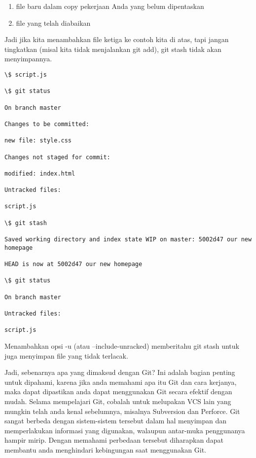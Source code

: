 \begin{enumerate}
\item file baru dalam copy pekerjaan Anda yang belum dipentaskan
\item file yang telah diabaikan
\setcounter{numberedCntB}{\theenumi}
\end{enumerate}
Jadi jika kita menambahkan file ketiga ke contoh kita di atas, tapi 
jangan tingkatkan (misal kita tidak menjalankan git add), git stash 
tidak akan menyimpannya.\vspace{12pt} 

\begin{verbatim}
\$ script.js

\$ git status

On branch master

Changes to be committed:

new file: style.css

Changes not staged for commit:

modified: index.html

Untracked files:

script.js

\$ git stash

Saved working directory and index state WIP on master: 5002d47 our new 
homepage

HEAD is now at 5002d47 our new homepage

\$ git status

On branch master

Untracked files:

script.js

\end{verbatim}

Menambahkan opsi -u (atau --include-unracked) memberitahu git stash 
untuk juga menyimpan file yang tidak terlacak.\vspace{12pt}



Jadi, sebenarnya apa yang dimaksud dengan Git? Ini adalah bagian penting 
untuk dipahami, karena jika anda memahami apa itu Git dan cara kerjanya, 
maka dapat dipastikan anda dapat menggunakan Git secara efektif dengan 
mudah. Selama mempelajari Git, cobalah untuk melupakan VCS lain yang 
mungkin telah anda kenal sebelumnya, misalnya Subversion dan Perforce. 
Git sangat berbeda dengan sistem-sistem tersebut dalam hal menyimpan dan 
memperlakukan informasi yang digunakan, walaupun antar-muka penggunanya 
hampir mirip. Dengan memahami perbedaan tersebut diharapkan dapat 
membantu anda menghindari kebingungan saat menggunakan Git.\vspace{12pt}

